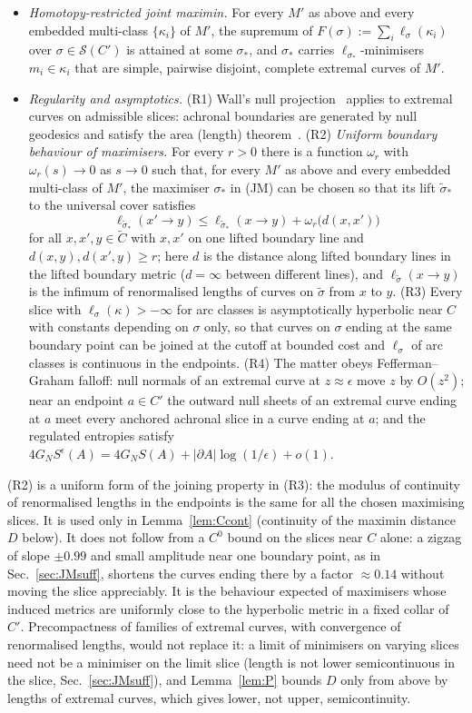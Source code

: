 \documentclass[aps,prd,onecolumn,superscriptaddress,nofootinbib,amsmath,amssymb,11pt]{revtex4-2}
\theoremstyle{definition}
\newcommand{\eps}{\epsilon}
\begin{document}
\begin{itemize}
\item[\textbf{(JM)}] \emph{Homotopy-restricted joint maximin.} For every $M'$ as above and every embedded multi-class
$\{\kappa_i\}$ of $M'$, the supremum of $F(\sigma):=\sum_i\ell_\sigma(\kappa_i)$ over $\sigma\in\mathcal S(C')$ is attained at
some $\sigma_*$, and $\sigma_*$ carries $\ell_{\sigma_*}$-minimisers $m_i\in\kappa_i$ that are simple, pairwise disjoint,
complete extremal curves of $M'$.
\item[\textbf{(R)}] \emph{Regularity and asymptotics.} (R1) Wall's null projection~\cite{Wall2014} applies to extremal
curves on admissible slices: achronal boundaries are generated by null geodesics and satisfy the area (length)
theorem~\cite{CDGH2001}. (R2) \emph{Uniform boundary behaviour of maximisers.} For every $r>0$ there is a function
$\omega_r$ with $\omega_r(s)\to0$ as $s\to0$ such that, for every $M'$ as above and every embedded multi-class of $M'$, the
maximiser $\sigma_*$ in (JM) can be chosen so that its lift $\tilde\sigma_*$ to the universal cover satisfies
\[
\ell_{\tilde\sigma_*}(x'\to y)\le\ell_{\tilde\sigma_*}(x\to y)+\omega_r\big(d(x,x')\big)
\]
for all $x,x',y\in\tilde C$ with $x,x'$ on one lifted boundary line and $d(x,y),d(x',y)\ge r$; here $d$ is the distance along
lifted boundary lines in the lifted boundary metric ($d=\infty$ between different lines), and $\ell_{\tilde\sigma}(x\to y)$ is the
infimum of renormalised lengths of curves on $\tilde\sigma$ from $x$ to $y$. (R3) Every slice with $\ell_\sigma(\kappa)>-\infty$
for arc classes is asymptotically hyperbolic near $C$ with constants depending on $\sigma$ only, so that curves on $\sigma$
ending at the same boundary point can be joined at the cutoff at bounded cost and $\ell_\sigma$ of arc classes is
continuous in the endpoints. (R4) The matter obeys Fefferman--Graham falloff: null normals of an extremal curve at
$z\approx\eps$ move $z$ by $O(z^2)$; near an endpoint $a\in C'$ the outward null sheets of an extremal curve ending at $a$
meet every anchored achronal slice in a curve ending at $a$; and the regulated entropies satisfy
$4G_NS^\eps(A)=4G_NS(A)+|\partial A|\log(1/\eps)+o(1)$.
\end{itemize}
(R2) is a uniform form of the joining property in (R3): the modulus of continuity of renormalised lengths in the endpoints
is the same for all the chosen maximising slices. It is used only in
Lemma~\ref{lem:Ccont} (continuity of the maximin distance $D$ below). It does not follow from a $C^0$ bound on the slices near $C$
alone: a zigzag of slope $\pm0.99$ and small amplitude near one boundary point, as in Sec.~\ref{sec:JMsuff}, shortens the curves
ending there by a factor $\approx0.14$ without moving the slice appreciably. It is the behaviour expected of maximisers whose
induced metrics are uniformly close to the hyperbolic metric in a fixed collar of $C'$. Precompactness of families of extremal
curves, with convergence of renormalised lengths, would not replace it: a limit of minimisers on varying slices need not be a
minimiser on the limit slice (length is not lower semicontinuous in the slice, Sec.~\ref{sec:JMsuff}), and Lemma~\ref{lem:P}
bounds $D$ only from above by lengths of extremal curves, which gives lower, not upper, semicontinuity.
\end{document}
